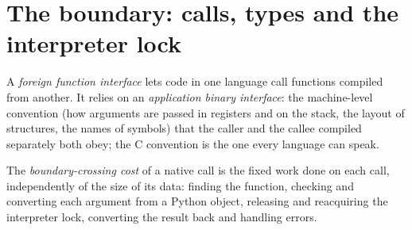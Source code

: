 \label{lst:pl:native-extensions:kernels}

\section{The boundary: calls, types and the interpreter lock}

\begin{definition}\label{def:pl:native-extensions:ffi}
A \emph{foreign function interface} lets code in one language call functions compiled from another.
It relies on an \emph{application binary interface}: the machine-level convention (how arguments
are passed in registers and on the stack, the layout of structures, the names of symbols) that the caller and the callee compiled
separately both obey; the C convention is the one every language can speak.
\end{definition}

\begin{definition}\label{def:pl:native-extensions:crossing}
The \emph{boundary-crossing cost} of a native call is the fixed work done on each call, independently of
the size of its data: finding the function, checking and converting each argument from a Python object, releasing and reacquiring the
interpreter lock, converting the result back and handling errors.
\end{definition}

